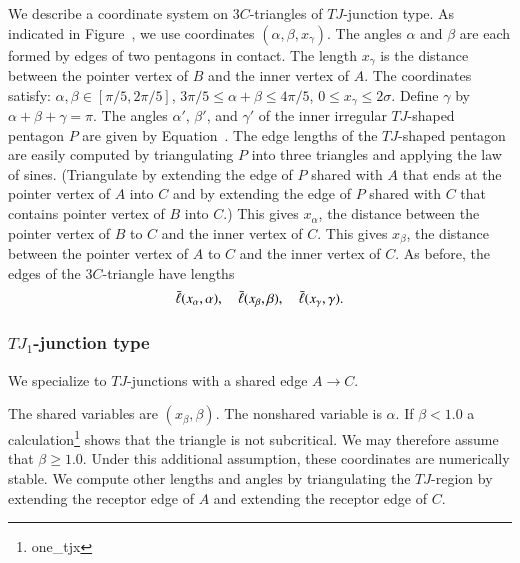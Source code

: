 We describe a coordinate system on $3C$-triangles of $TJ$-junction
type.  As indicated in Figure~, we use coordinates
$(\alpha,\beta,x_\gamma)$.  The angles $\alpha$ and $\beta$ are each
formed by edges of two pentagons in contact.  The length $x_\gamma$ is
the distance between the pointer vertex of $B$ and the inner vertex of
$A$.  The coordinates satisfy: $\alpha,\beta\in[\pi/5,2\pi/5]$,
$3\pi/5\le \alpha+\beta\le 4\pi/5$, $0\le x_\gamma\le 2\sigma$.
Define $\gamma$ by $\alpha+\beta+\gamma=\pi$.  The angles $\alpha'$,
$\beta'$, and $\gamma'$ of the inner irregular $TJ$-shaped pentagon $P$
are given by Equation~.  The edge lengths of the
$TJ$-shaped pentagon are easily computed by triangulating $P$ into
three triangles and applying the law of sines.  (Triangulate by
extending the edge of $P$ shared with $A$ that ends at the pointer
vertex of $A$ into $C$ and by extending the edge of $P$ shared with
$C$ that contains pointer vertex of $B$ into $C$.)  This gives
$x_\alpha$, the distance between the pointer vertex of $B$ to $C$ and
the inner vertex of $C$.  This gives $x_\beta$, the distance between
the pointer vertex of $A$ to $C$ and the inner vertex of $C$.  As
before, the edges of the $3C$-triangle have lengths
\[
\bar\ell(x_\alpha,\alpha),\quad \bar\ell(x_\beta,\beta),\quad \bar\ell(x_\gamma,\gamma).
\]




\subsubsection{$TJ_1$-junction type}

We specialize to $TJ$-junctions with a shared edge $A\to C$.

The shared variables are $(x_\beta,\beta)$.  The nonshared variable is
$\alpha$.  If $\beta < 1.0$ a calculation\footnote{one\_tjx} shows
that the triangle is not subcritical.  We may therefore assume that
$\beta \ge 1.0$.  Under this additional assumption, these coordinates
are numerically stable.  We compute other lengths and angles by
triangulating the $TJ$-region by extending the receptor edge of $A$
and extending the receptor edge of $C$.

